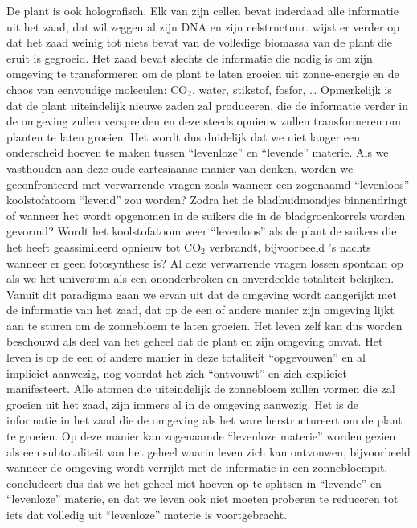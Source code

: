 \documentclass[
  11pt,
]{book}
\begin{document}
De plant is ook holografisch. Elk van zijn cellen bevat inderdaad alle informatie uit het zaad, dat wil zeggen al zijn DNA en zijn celstructuur. \citet{bohm1980} wijst er verder op dat het zaad weinig tot niets bevat van de volledige biomassa van de plant die eruit is gegroeid. Het zaad bevat slechts de informatie die nodig is om zijn omgeving te transformeren om de plant te laten groeien uit zonne-energie en de chaos van eenvoudige moleculen: CO\(_2\), water, stikstof, fosfor, \ldots{} Opmerkelijk is dat de plant uiteindelijk nieuwe zaden zal produceren, die de informatie verder in de omgeving zullen verspreiden en deze steeds opnieuw zullen transformeren om planten te laten groeien. Het wordt dus duidelijk dat we niet langer een onderscheid hoeven te maken tussen ``levenloze'' en ``levende'' materie. Als we vasthouden aan deze oude cartesiaanse manier van denken, worden we geconfronteerd met verwarrende vragen zoals wanneer een zogenaamd ``levenloos'' koolstofatoom ``levend'' zou worden? Zodra het de bladhuidmondjes binnendringt of wanneer het wordt opgenomen in de suikers die in de bladgroenkorrels worden gevormd? Wordt het koolstofatoom weer ``levenloos'' als de plant de suikers die het heeft geassimileerd opnieuw tot CO\(_2\) verbrandt, bijvoorbeeld 's nachts wanneer er geen fotosynthese is? Al deze verwarrende vragen lossen spontaan op als we het universum als een ononderbroken en onverdeelde totaliteit bekijken. Vanuit dit paradigma gaan we ervan uit dat de omgeving wordt aangerijkt met de informatie van het zaad, dat op de een of andere manier zijn omgeving lijkt aan te sturen om de zonnebloem te laten groeien. Het leven zelf kan dus worden beschouwd als deel van het geheel dat de plant en zijn omgeving omvat. Het leven is op de een of andere manier in deze totaliteit ``opgevouwen'' en al impliciet aanwezig, nog voordat het zich ``ontvouwt'' en zich expliciet manifesteert. Alle atomen die uiteindelijk de zonnebloem zullen vormen die zal groeien uit het zaad, zijn immers al in de omgeving aanwezig. Het is de informatie in het zaad die de omgeving als het ware herstructureert om de plant te groeien. Op deze manier kan zogenaamde ``levenloze materie'' worden gezien als een subtotaliteit van het geheel waarin leven zich kan ontvouwen, bijvoorbeeld wanneer de omgeving wordt verrijkt met de informatie in een zonnebloempit. \citet{bohm1980} concludeert dus dat we het geheel niet hoeven op te splitsen in ``levende'' en ``levenloze'' materie, en dat we leven ook niet moeten proberen te reduceren tot iets dat volledig uit ``levenloze'' materie is voortgebracht.
\end{document}
